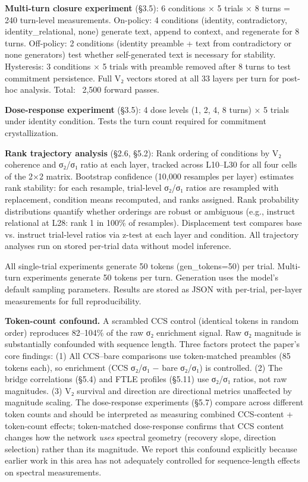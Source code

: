 \documentclass[12pt]{article}
\begin{document}
\textbf{Multi-turn closure experiment} (§3.5): 6 conditions × 5 trials × 8 turns = 240 turn-level measurements. On-policy: 4 conditions (identity, contradictory, identity\_relational, none) generate text, append to context, and regenerate for 8 turns. Off-policy: 2 conditions (identity preamble + text from contradictory or none generators) test whether self-generated text is necessary for stability. Hysteresis: 3 conditions × 5 trials with preamble removed after 8 turns to test commitment persistence. Full V₂ vectors stored at all 33 layers per turn for post-hoc analysis. Total: ~2,500 forward passes.

\textbf{Dose-response experiment} (§3.5): 4 dose levels (1, 2, 4, 8 turns) × 5 trials under identity condition. Tests the turn count required for commitment crystallization.

\textbf{Rank trajectory analysis} (§2.6, §5.2): Rank ordering of conditions by V₂ coherence and σ₂/σ₁ ratio at each layer, tracked across L10–L30 for all four cells of the 2×2 matrix. Bootstrap confidence (10,000 resamples per layer) estimates rank stability: for each resample, trial-level σ₂/σ₁ ratios are resampled with replacement, condition means recomputed, and ranks assigned. Rank probability distributions quantify whether orderings are robust or ambiguous (e.g., instruct relational at L28: rank 1 in 100\% of resamples). Displacement test compares base vs. instruct trial-level ratios via z-test at each layer and condition. All trajectory analyses run on stored per-trial data without model inference.

All single-trial experiments generate 50 tokens (gen\_tokens=50) per trial. Multi-turn experiments generate 50 tokens per turn. Generation uses the model's default sampling parameters. Results are stored as JSON with per-trial, per-layer measurements for full reproducibility.

\textbf{Token-count confound.} A scrambled CCS control (identical tokens in random order) reproduces 82–104\% of the raw σ₂ enrichment signal. Raw σ₂ magnitude is substantially confounded with sequence length. Three factors protect the paper's core findings: (1) All CCS–bare comparisons use token-matched preambles (85 tokens each), so enrichment (CCS σ₂/σ₁ − bare σ₂/σ₁) is controlled. (2) The bridge correlations (§5.4) and FTLE profiles (§5.11) use σ₂/σ₁ ratios, not raw magnitudes. (3) V₂ survival and direction are directional metrics unaffected by magnitude scaling. The dose-response experiments (§5.7) compare across different token counts and should be interpreted as measuring combined CCS-content + token-count effects; token-matched dose-response confirms that CCS content changes how the network \textit{uses} spectral geometry (recovery slope, direction selection) rather than its magnitude. We report this confound explicitly because earlier work in this area has not adequately controlled for sequence-length effects on spectral measurements.
\end{document}
